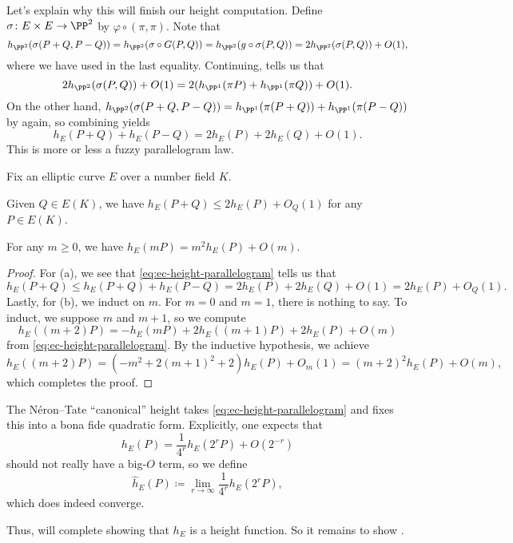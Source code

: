 \documentclass[../notes.tex]{subfiles}
\begin{document}
Let's explain why this will finish our height computation. Define $\sigma\colon E\times E\to\PP^2$ by $\varphi\circ(\pi,\pi)$. Note that
\[h_{\PP^2}(\sigma(P+Q,P-Q))=h_{\PP^2}(\sigma\circ G(P,Q))=h_{\PP^2}(g\circ\sigma(P,Q))=2h_{\PP^2}(\sigma(P,Q))+O(1),\]
where we have used  in the last equality. Continuing,  tells us that
\[2h_{\PP^2}(\sigma(P,Q))+O(1)=2(h_{\PP^1}(\pi P)+h_{\PP^1}(\pi Q))+O(1).\]
On the other hand, $h_{\PP^2}(\sigma(P+Q,P-Q))=h_{\PP^1}(\pi(P+Q))+h_{\PP^1}(\pi(P-Q))$ by  again, so combining yields
\begin{equation}
	h_E(P+Q)+h_E(P-Q)=2h_E(P)+2h_E(Q)+O(1). \label{eq:ec-height-parallelogram}
\end{equation}
This is more or less a fuzzy parallelogram law.
\begin{corollary} \label{cor:finishing-height}
	Fix an elliptic curve $E$ over a number field $K$.
	\begin{listalph}
		\item Given $Q\in E(K)$, we have $h_E(P+Q)\le 2h_E(P)+O_Q(1)$ for any $P\in E(K)$.
		\item For any $m\ge0$, we have $h_E(mP)=m^2h_E(P)+O(m)$.
	\end{listalph}
\end{corollary}
\begin{proof}
	For (a), we see that \eqref{eq:ec-height-parallelogram} tells us that
	\[h_E(P+Q)\le h_E(P+Q)+h_E(P-Q)=2h_E(P)+2h_E(Q)+O(1)=2h_E(P)+O_Q(1).\]
	Lastly, for (b), we induct on $m$. For $m=0$ and $m=1$, there is nothing to say. To induct, we suppose $m$ and $m+1$, so we compute
	\[h_E((m+2)P)=-h_E(mP)+2h_E((m+1)P)+2h_E(P)+O(m)\]
	from \eqref{eq:ec-height-parallelogram}. By the inductive hypothesis, we achieve
	\[h_E((m+2)P)=\left(-m^2+2(m+1)^2+2\right)h_E(P)+O_m(1)=(m+2)^2h_E(P)+O(m),\]
	which completes the proof.
\end{proof}
\begin{remark}
	The N\'eron--Tate ``canonical'' height takes \eqref{eq:ec-height-parallelogram} and fixes this into a bona fide quadratic form. Explicitly, one expects that
	\[h_E(P)=\frac1{4^r}h_E\left(2^rP\right)+O\left(2^{-r}\right)\]
	should not really have a big-$O$ term, so we define
	\[\hat h_E(P)\coloneqq\lim_{r\to\infty}\frac1{4^r}h_E\left(2^rP\right),\]
	which does indeed converge.
\end{remark}
Thus,  will complete showing that $h_E$ is a height function. So it remains to show .
\end{document}
